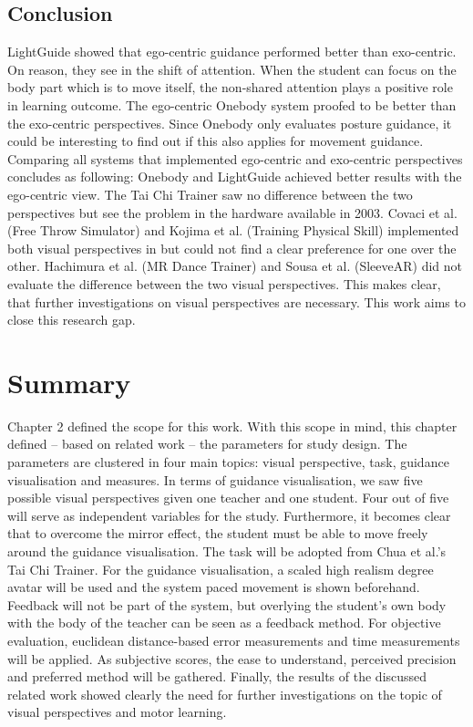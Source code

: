 \subsection{Conclusion}
LightGuide showed that ego-centric guidance performed better than exo-centric. On reason, they see in the shift of attention. When the student can focus on the body part which is to move itself, the non-shared attention plays a positive role in learning outcome. The ego-centric Onebody system proofed to be better than the exo-centric perspectives. Since Onebody only evaluates posture guidance, it could be interesting to find out if this also applies for movement guidance. Comparing all systems that implemented ego-centric and exo-centric perspectives concludes as following: Onebody and LightGuide achieved better results with the ego-centric view. The Tai Chi Trainer saw no difference between the two perspectives but see the problem in the hardware available in 2003. Covaci et al. (Free Throw Simulator) \cite{Covaci2014} and Kojima et al. (Training Physical Skill) \cite{Kojima2014} implemented both visual perspectives in but could not find a clear preference for one over the other. Hachimura et al. (MR Dance Trainer) \cite{Hachimura2004} and Sousa et al. (SleeveAR) \cite{Sousa2016} did not evaluate the difference between the two visual perspectives. This makes clear, that further investigations on visual perspectives are necessary. This work aims to close this research gap.

\section{Summary}
Chapter 2 defined the scope for this work. With this scope in mind, this chapter defined \--- based on related work \--- the parameters for study design. The parameters are clustered in four main topics: visual perspective, task, guidance visualisation and measures. In terms of guidance visualisation, we saw five possible visual perspectives given one teacher and one student. Four out of five will serve as independent variables for the study. Furthermore, it becomes clear that to overcome the mirror effect, the student must be able to move freely around the guidance visualisation. The task will be adopted from Chua et al.'s Tai Chi Trainer. For the guidance visualisation, a scaled high realism degree avatar will be used and the system paced movement is shown beforehand. Feedback will not be part of the system, but overlying the student's own body with the body of the teacher can be seen as a feedback method. For objective evaluation, euclidean distance-based error measurements and time measurements will be applied. As subjective scores, the ease to understand, perceived precision and preferred method will be gathered. Finally, the results of the discussed related work showed clearly the need for further investigations on the topic of visual perspectives and motor learning.


